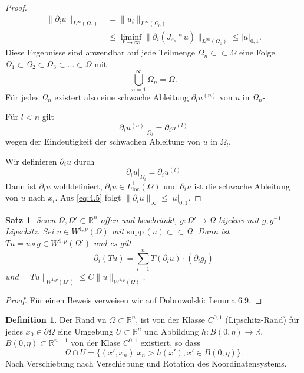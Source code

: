 \documentclass[
paper=a4,
bibtotocnumbered,
liststotocnumbered,
tablecaptionabove,
pointlessnumbers,
twoside,
openright,
10pt
]
{report}
\newcommand{\supp}{\mathrm{supp}\,}
\newtheorem{satz}[thm]{Satz}
\theoremstyle{definition}
\newtheorem*{df}{Definition}
\numberwithin{equation}{chapter}
\begin{document}
\begin{proof}
\begin{equation}
\begin{split}
\| \partial_i u\|_{L^\infty(\Omega_0)} &= \| u_i \|_{L^\infty(\Omega_0)} \\
&\le \liminf_{k\to \infty} \| \partial_i (J_{\varepsilon_k} * u) \|_{L^\infty(\Omega_0)} \le |u|_{0,1}. 
\end{split}
\end{equation}
Diese Ergebnisse sind anwendbar auf jede Teilmenge $\Omega_n\subset \subset \Omega$ eine Folge $\Omega_1 \subset \Omega_2 \subset \Omega_3 \subset \ldots \subset \Omega$ mit
\begin{equation}
 \bigcup_{n=1}^\infty \Omega_n = \Omega.
\end{equation}
Für jedes $\Omega_n$ existert also eine schwache Ableitung $\partial_i u^{(n)}$ von $u$ in $\Omega_n$-

Für $l<n$ gilt 
\begin{equation}
  \partial_i u^{(n)} \big |_{\Omega_l} = \partial_i u^{(l)}
\end{equation}
wegen der Eindeutigkeit der schwachen Ableitung von $u$ in $\Omega_l$.

Wir definieren $\partial_i u$ durch
\begin{equation}
 \partial_i u\big |_{\Omega_l}  = \partial_i u^{(l)}
\end{equation}
Dann ist $\partial_i u$ wohldefiniert, $\partial_i u\in L^1_{\text{loc}}(\Omega)$ und $\partial_i u$ ist die schwache Ableitung von $u$ nach $x_i$.  Aus \eqref{eq:4.5} folgt $\|\partial_i u\|_\infty \le |u|_{0,1}$.
\end{proof}
\begin{satz}\label{4.5}
 Seien $\Omega, \Omega'\subset \mathbb R^n$ offen und beschränkt, $g: \Omega' \to \Omega$ bijektiv mit $g, g^{-1}$ Lipschitz. Sei $u\in W^{1,p}(\Omega)$ mit $\supp(u) \subset \subset \Omega$. Dann ist $Tu=u\circ g \in W^{1,p}(\Omega')$ und es gilt
 \begin{equation}
  \partial_i (Tu) = \sum_{l=1}^n T(\partial_l u) \cdot (\partial_i g_l)
 \end{equation}
und $\|Tu\|_{W^{1,p}(\Omega')} \le C\|u\|_{W^{1,p}(\Omega)}$.
\end{satz}
\begin{proof}
 Für einen Beweis verweisen wir auf Dobrowolski: Lemma 6.9.
\end{proof}

\begin{df}
 Der Rand vn $\Omega \subset \mathbb R^n$, ist von der Klasse $C^{0,1}$ (Lipschitz-Rand) für jedes $x_0 \in \partial \Omega$ eine Umgebung $U\subset \mathbb R^n$ und Abbildung $h: B(0, \eta) \to \mathbb R$, $B(0,\eta) \subset \mathbb R^{n-1}$ von der Klase $C^{0,1}$ existiert, so dass
 \begin{equation}
  \Omega \cap U = \{(x', x_n) | x_n > h(x'), x'\in B(0,\eta)\}.
 \end{equation}
 Nach Verschiebung nach Verschiebung und Rotation des Koordinatensystems.
\end{df}
\end{document}
